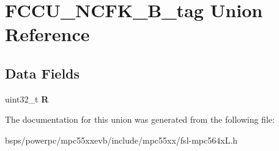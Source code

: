 \hypertarget{unionFCCU__NCFK__32B__tag}{}\section{F\+C\+C\+U\+\_\+\+N\+C\+F\+K\+\_\+B\+\_\+tag Union Reference}
\label{unionFCCU__NCFK__32B__tag}
\subsection*{Data Fields}
\begin{DoxyCompactItemize}
\item 
\mbox{\label{unionFCCU__NCFK__32B__tag_a1ef79530cd31a4638949504d5d022617}} 
uint32\+\_\+t {\bfseries R}
\end{DoxyCompactItemize}


The documentation for this union was generated from the following file\+:\begin{DoxyCompactItemize}
\item 
bsps/powerpc/mpc55xxevb/include/mpc55xx/fsl-\/mpc564x\+L.\+h\end{DoxyCompactItemize}
